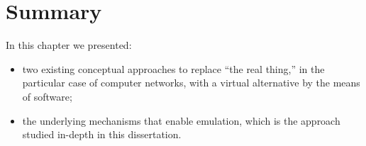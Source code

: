 \section{Summary}
\label{sec:leavingsummary}

In this chapter we presented:
\begin{itemize}
  \item two existing conceptual approaches to replace ``the real thing,'' in the particular case of computer networks, with a virtual alternative by the means of software;
  \item the underlying mechanisms that enable emulation, which is the approach studied in-depth in this dissertation.
\end{itemize}

